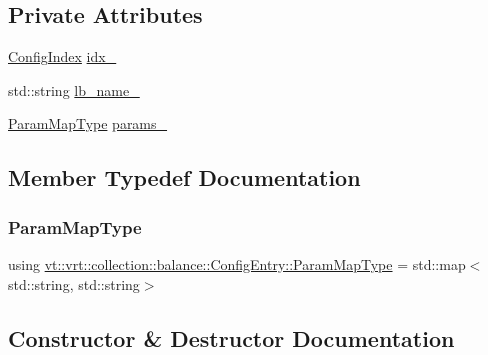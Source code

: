 \subsection*{Private Attributes}
\begin{DoxyCompactItemize}
\item 
\hyperlink{namespacevt_1_1vrt_1_1collection_1_1balance_ac1bb9eee8129549177880dbb4e5f6a34}{Config\+Index} \hyperlink{structvt_1_1vrt_1_1collection_1_1balance_1_1_config_entry_abe3386d77acb784a166a2c2484bac4a1}{idx\+\_\+}
\item 
std\+::string \hyperlink{structvt_1_1vrt_1_1collection_1_1balance_1_1_config_entry_accbac6ed9e02043f4b1b4e513a8d4ccb}{lb\+\_\+name\+\_\+}
\item 
\hyperlink{structvt_1_1vrt_1_1collection_1_1balance_1_1_config_entry_a23bc47f965b2069f4015c839a9e1f66d}{Param\+Map\+Type} \hyperlink{structvt_1_1vrt_1_1collection_1_1balance_1_1_config_entry_a031eb5f8dd4ccff626e664f51c2ea175}{params\+\_\+}
\end{DoxyCompactItemize}


\subsection{Member Typedef Documentation}
\mbox{\label{structvt_1_1vrt_1_1collection_1_1balance_1_1_config_entry_a23bc47f965b2069f4015c839a9e1f66d}} 
\subsubsection{\texorpdfstring{Param\+Map\+Type}{ParamMapType}}
{\footnotesize\ttfamily using \hyperlink{structvt_1_1vrt_1_1collection_1_1balance_1_1_config_entry_a23bc47f965b2069f4015c839a9e1f66d}{vt\+::vrt\+::collection\+::balance\+::\+Config\+Entry\+::\+Param\+Map\+Type} =  std\+::map$<$std\+::string, std\+::string$>$}



\subsection{Constructor \& Destructor Documentation}
\mbox{\label{structvt_1_1vrt_1_1collection_1_1balance_1_1_config_entry_a83f2baf2d7eea59fee6aeccb85fa6ca2}} 
